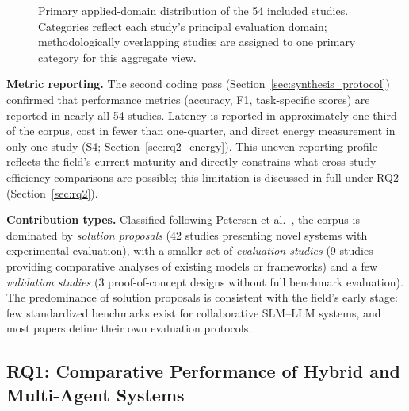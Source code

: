 \begin{figure}[!htbp]
\centering
{}
\caption{Primary applied-domain distribution of the 54 included studies. Categories reflect each study's principal evaluation domain; methodologically overlapping studies are assigned to one primary category for this aggregate view.}
\label{fig:domain-distribution}
\end{figure}

\textbf{Metric reporting.} The second coding pass (Section~\ref{sec:synthesis_protocol}) confirmed that performance metrics (accuracy, F1, task-specific scores) are reported in nearly all 54 studies. Latency is reported in approximately one-third of the corpus, cost in fewer than one-quarter, and direct energy measurement in only one study (S4; Section~\ref{sec:rq2_energy}). This uneven reporting profile reflects the field's current maturity and directly constrains what cross-study efficiency comparisons are possible; this limitation is discussed in full under RQ2 (Section~\ref{sec:rq2}).

\textbf{Contribution types.} Classified following Petersen et al.~\cite{petersen2008systematic}, the corpus is dominated by \textit{solution proposals} (42 studies presenting novel systems with experimental evaluation), with a smaller set of \textit{evaluation studies} (9 studies providing comparative analyses of existing models or frameworks) and a few \textit{validation studies} (3 proof-of-concept designs without full benchmark evaluation). The predominance of solution proposals is consistent with the field's early stage: few standardized benchmarks exist for collaborative SLM--LLM systems, and most papers define their own evaluation protocols.

\subsection{RQ1: Comparative Performance of Hybrid and Multi-Agent Systems}
\label{sec:rq1}

